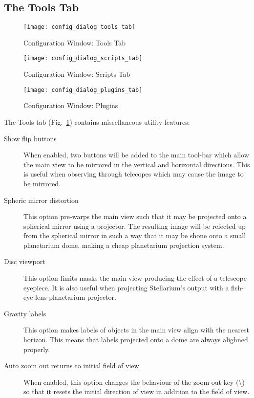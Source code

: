 \subsection{The Tools Tab}
\label{sec:gui:configuration:tools}


\begin{figure}[p]
\centering\texttt{[image: config\_dialog\_tools\_tab]}
\caption{Configuration Window: Tools Tab}
\label{fig:gui:configuration:tools}
\end{figure}

\begin{figure}[p]
\centering\texttt{[image: config\_dialog\_scripts\_tab]}
\caption{Configuration Window: Scripts Tab}
\label{fig:gui:configuration:scripts}
\end{figure}

\begin{figure}[p]
\centering\texttt{[image: config\_dialog\_plugins\_tab]}
\caption{Configuration Window: Plugins}
\label{fig:gui:plugins}
\end{figure}


The Tools tab (Fig.~\ref{fig:gui:configuration:tools}) contains miscellaneous utility
features:

\begin{description}
\item[Show flip buttons] When enabled, two buttons will be added to
  the main tool-bar which allow the main view to be mirrored in the
  vertical and horizontal directions. This is useful when observing
  through telecopes which may cause the image to be mirrored.
\item[Spheric mirror distortion] This option pre-warps the main view
  such that it may be projected onto a spherical mirror using a
  projector. The resulting image will be refected up from the spherical
  mirror in such a way that it may be shone onto a small planetarium
  dome, making a cheap planetarium projection system.
\item[Disc viewport] This option limits masks the main view
  producing the effect of a telescope eyepiece. It is also useful when
  projecting Stellarium's output with a fish-eye lens planetarium
  projector.
\item[Gravity labels] This option makes labels of objects in the
  main view align with the nearest horizon. This means that labels
  projected onto a dome are always alighned properly.
\item[Auto zoom out returns to initial field of view] When enabled,
  this option changes the behaviour of the zoom out key
  (\textbackslash{}) so that it resets the initial direction of view in
  addition to the field of view.
\end{description}

